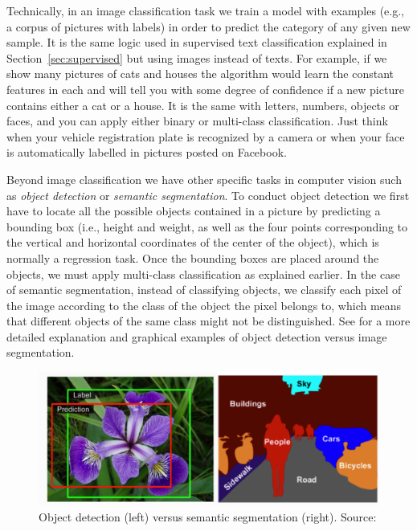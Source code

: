 Technically, in an image classification task we train a model with examples (e.g., a corpus of pictures with labels) in order to predict the category of any given new sample. It is the same logic used in supervised text classification  explained in Section~\ref{sec:supervised} but using images instead of texts. For example, if we show many pictures of cats and houses the algorithm would learn the constant features in each and will tell you with some degree of confidence if a new picture contains either a cat or a house. It is the same with letters, numbers, objects or faces, and you can apply either binary or multi-class classification. Just think when your vehicle registration plate is recognized by a camera or when your face is automatically labelled in pictures posted on Facebook.

Beyond image classification we have other specific tasks in computer vision such as \textit{object detection} or \textit{semantic segmentation}. To conduct object detection we first have to locate all the possible objects contained in a picture by predicting a bounding box (i.e., height and weight, as well as the four points corresponding to the vertical and horizontal coordinates of the center of the object), which is normally a regression task. Once the bounding boxes are placed around the objects, we must apply multi-class classification as explained earlier. In the case of semantic segmentation, instead of classifying objects, we classify each pixel of the image according to the class of the object the pixel belongs to, which means that different objects of the same class might not be distinguished. See \citet{geron2019hands} for a more detailed explanation and graphical examples of object detection versus image segmentation.

\begin{figure}
\centering
\includegraphics[width=0.9\linewidth]{figures/ch15_location.png}
\caption{Object detection (left) versus semantic segmentation (right).
Source: \citet{geron2019hands}}
\label{fig:location}
\end{figure}

